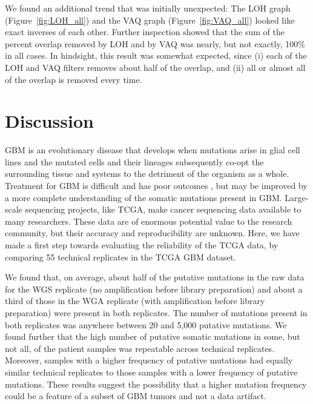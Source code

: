 \documentclass[11 pt]{article} %
\begin{document}
We found an additional trend that was initially unexpected: The LOH graph (Figure~\ref{fig:LOH_all}) and the VAQ graph (Figure~\ref{fig:VAQ_all}) looked like exact inverses of each other. Further inspection showed that the sum of the percent overlap removed by LOH and by VAQ was nearly, but not exactly, 100\% in all cases. In hindsight, this result was somewhat expected, since (i) each of the LOH and VAQ filters removes about half of the overlap, and (ii) all or almost all of the overlap is removed every time.

\section*{Discussion}

GBM is an evolutionary disease that develops when mutations arise in glial cell lines and the mutated cells and their lineages subsequently co-opt the surrounding tissue and systems to the detriment of the organism as a whole. Treatment for GBM is difficult and has poor outcomes \citep{GBM-stats}, but may be improved by a more complete understanding of the somatic mutations present in GBM. Large-scale sequencing projects, like TCGA, make cancer sequencing data available to many researchers. These data are of enormous potential value to the research community, but their accuracy and reproducibility are unknown. Here, we have made a first step towards evaluating the reliability of the TCGA data, by comparing 55 technical replicates in the TCGA GBM dataset.

We found that, on average, about half of the putative mutations in the raw data for the WGS replicate (no amplification before library preparation) and about a third of those in the WGA replicate (with amplification before library preparation) were present in both replicates. The number of mutations present in both replicates was anywhere between 20 and 5,000 putative mutations. We found further that the high number of putative somatic mutations in some, but not all, of the patient samples was repeatable across technical replicates. Moreover, samples with a higher frequency of putative mutations had equally similar technical replicates to those samples with a lower frequency of putative mutations. These results suggest the possibility that a higher mutation frequency could be a feature of a subset of GBM tumors and not a data artifact.
\end{document}
